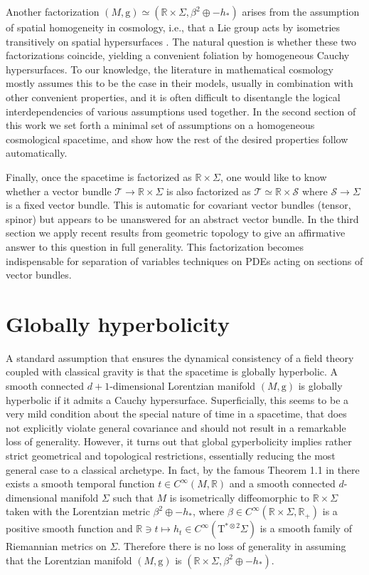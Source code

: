 \documentclass{article}
\begin{document}
Another factorization $(M,\mathrm{g})\simeq(\mathbb{R}\times\Sigma,\beta^2\oplus-h_*)$ arises from the assumption of spatial homogeneity in cosmology, i.e., that a Lie group acts by isometries transitively on spatial hypersurfaces \cite{StephaniKramerMacCallumHoenselaersHerlt2003}. The natural question is whether these two factorizations coincide, yielding a convenient foliation by homogeneous Cauchy hypersurfaces. To our knowledge, the literature in mathematical cosmology mostly assumes this to be the case in their models, usually in combination with other convenient properties, and it is often difficult to disentangle the logical interdependencies of various assumptions used together. In the second section of this work we set forth a minimal set of assumptions on a homogeneous cosmological spacetime, and show how the rest of the desired properties follow automatically.

Finally, once the spacetime is factorized as $\mathbb{R}\times\Sigma$, one would like to know whether a vector bundle $\mathcal{T}\to\mathbb{R}\times\Sigma$ is also factorized as $\mathcal{T}\simeq\mathbb{R}\times\mathcal{S}$ where $\mathcal{S}\to\Sigma$ is a fixed vector bundle. This is automatic for covariant vector bundles (tensor, spinor) but appears to be unanswered for an abstract vector bundle. In the third section we apply recent results from geometric topology to give an affirmative answer to this question in full generality. This factorization becomes indispensable for separation of variables techniques on PDEs acting on sections of vector bundles.

\section*{Globally hyperbolicity}

A standard assumption that ensures the dynamical consistency of a field theory coupled with classical gravity is that the spacetime is globally hyperbolic. A smooth connected $d+1$-dimensional Lorentzian manifold $(M,\mathrm{g})$ is globally hyperbolic if it admits a Cauchy hypersurface. Superficially, this seems to be a very mild condition about the special nature of time in a spacetime, that does not explicitly violate general covariance and should not result in a remarkable loss of generality. However, it turns out that global gyperbolicity implies rather strict geometrical and topological restrictions, essentially reducing the most general case to a classical archetype. In fact, by the famous Theorem 1.1 in \cite{BernalSanchez2005} there exists a smooth temporal function $t\in C^\infty(M,\mathbb{R})$ and a smooth connected $d$-dimensional manifold $\Sigma$ such that $M$ is isometrically diffeomorphic to $\mathbb{R}\times\Sigma$ taken with the Lorentzian metric $\beta^2\oplus-h_*$, where $\beta\in C^\infty(\mathbb{R}\times\Sigma,\mathbb{R}_+)$ is a positive smooth function and $\mathbb{R}\ni t\mapsto h_t\in C^\infty(\mathrm{T}^{*\otimes2}\Sigma)$ is a smooth family of Riemannian metrics on $\Sigma$. Therefore there is no loss of generality in assuming that the Lorentzian manifold $(M,\mathrm{g})$ is $(\mathbb{R}\times\Sigma,\beta^2\oplus-h_*)$.
\end{document}
